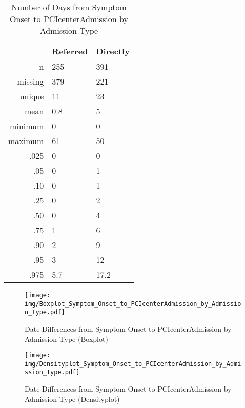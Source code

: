 \documentclass[a4paper]{report}
\begin{document}
\begin{itemize}
{\clearpage

\begin{table}[ht]
\centering
\begin{tabular}{rll}
  \toprule
 & Referred & Directly \\ 
  \midrule
n & 255 & 391 \\ 
  missing & 379 & 221 \\ 
  unique & 11 & 23 \\ 
  mean & 0.8 & 5 \\ 
  minimum & 0 & 0 \\ 
  maximum & 61 & 50 \\ 
  .025 & 0 & 0 \\ 
  .05 & 0 & 1 \\ 
  .10 & 0 & 1 \\ 
  .25 & 0 & 2 \\ 
  .50 & 0 & 4 \\ 
  .75 & 1 & 6 \\ 
  .90 & 2 & 9 \\ 
  .95 & 3 & 12 \\ 
  .975 & 5.7 & 17.2 \\ 
   \bottomrule
\end{tabular}
\caption{Number of Days from Symptom Onset to PCIcenterAdmission by Admission Type} 
\end{table}
\begin{figure}
  \centering
  \caption{Date Differences from Symptom Onset to PCIcenterAdmission by Admission Type (Boxplot)}
  \label{Boxplot: Date Differences from Symptom Onset to PCIcenterAdmission by Admission Type}
\texttt{[image: img/Boxplot\_Symptom\_Onset\_to\_PCIcenterAdmission\_by\_Admission\_Type.pdf]}\end{figure}


\begin{figure}
  \centering
  \caption{Date Differences from Symptom Onset to PCIcenterAdmission by Admission Type (Densityplot)}
  \label{Density: Date Differences from Symptom Onset to PCIcenterAdmission by Admission Type}
\texttt{[image: img/Densityplot\_Symptom\_Onset\_to\_PCIcenterAdmission\_by\_Admission\_Type.pdf]}\end{figure}


\clearpage

}
\end{itemize}
\end{document}
